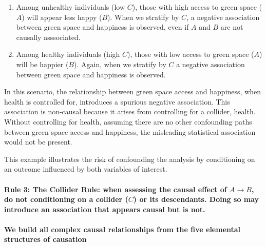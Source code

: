 \documentclass[
  singlecolumn]{article}
\let\oldparagraph\paragraph
\renewcommand{\paragraph}[1]{\oldparagraph{#1}\mbox{}}
\begin{document}
\begin{enumerate}
\def\labelenumi{\arabic{enumi}.}
\item
  Among unhealthy individuals (low \(C\)), those with high access to
  green space (\(A\)) will appear less happy (\(B\)). When we stratify
  by \(C\), a negative association between green space and happiness is
  observed, even if \(A\) and \(B\) are not causally asssociated.
\item
  Among healthy individuals (high \(C\)), those with low access to green
  space (\(A\)) will be happier (\(B\)). Again, when we stratify by
  \(C\) a negative association between green space and happiness is
  observed.
\end{enumerate}

In this scenario, the relationship between green space access and
happiness, when health is controlled for, introduces a spurious negative
association. This association is non-causal because it arises from
controlling for a collider, health. Without controlling for health,
assuming there are no other confounding paths between green space access
and happiness, the misleading statistical association would not be
present.

This example illustrates the risk of confounding the analysis by
conditioning on an outcome influenced by both variables of interest.

\paragraph{\texorpdfstring{\textbf{Rule 3: The Collider Rule:} when
assessing the causal effect of \(A\to B\), do not conditioning on a
collider (\(C\)) or its descendants. Doing so may introduce an
association that appears causal but is
not.}{Rule 3: The Collider Rule: when assessing the causal effect of A\textbackslash to B, do not conditioning on a collider (C) or its descendants. Doing so may introduce an association that appears causal but is not.}}\label{rule-3-the-collider-rule-when-assessing-the-causal-effect-of-ato-b-do-not-conditioning-on-a-collider-c-or-its-descendants.-doing-so-may-introduce-an-association-that-appears-causal-but-is-not.}

\paragraph{We build all complex causal relationships from the five
elemental structures of
causation}\label{we-build-all-complex-causal-relationships-from-the-five-elemental-structures-of-causation}
\end{document}
